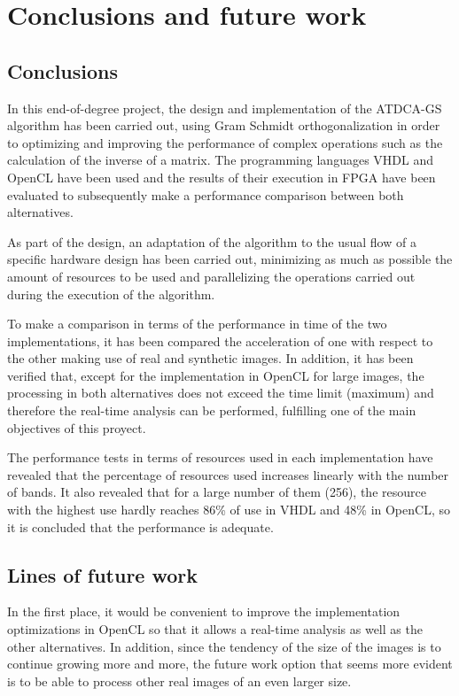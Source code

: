 \cleardoublepage
\newpage
\mbox{}

\chapter{Conclusions and future work}
\label{Appendix:Conclusion}

\section{Conclusions}

In this end-of-degree project, the design and implementation of the ATDCA-GS algorithm has been carried out, using Gram Schmidt orthogonalization in order to optimizing and improving the performance of complex operations such as the calculation of the inverse of a matrix. The programming languages VHDL and OpenCL have been used and the results of their execution in FPGA have been evaluated to subsequently make a performance comparison between both alternatives.

As part of the design, an adaptation of the algorithm to the usual flow of a specific hardware design has been carried out, minimizing as much as possible the amount of resources to be used and parallelizing the operations carried out during the execution of the algorithm.

To make a comparison in terms of the performance in time of the two implementations, it has been compared the acceleration of one with respect to the other making use of real and synthetic images. In addition, it has been verified that, except for the implementation in OpenCL for large images, the processing in both alternatives does not exceed the time limit (maximum) and therefore the real-time analysis can be performed, fulfilling one of the main objectives of this proyect.

The performance tests in terms of resources used in each implementation have revealed that the percentage of resources used increases linearly with the number of bands. It also revealed that for a large number of them (256), the resource with the highest use hardly reaches 86\% of use in VHDL and 48\% in OpenCL, so it is concluded that the performance is adequate.

\section{Lines of future work}

In the first place, it would be convenient to improve the implementation optimizations in OpenCL so that it allows a real-time analysis as well as the other alternatives. In addition, since the tendency of the size of the images is to continue growing more and more, the future work option that seems more evident is to be able to process other real images of an even larger size.

